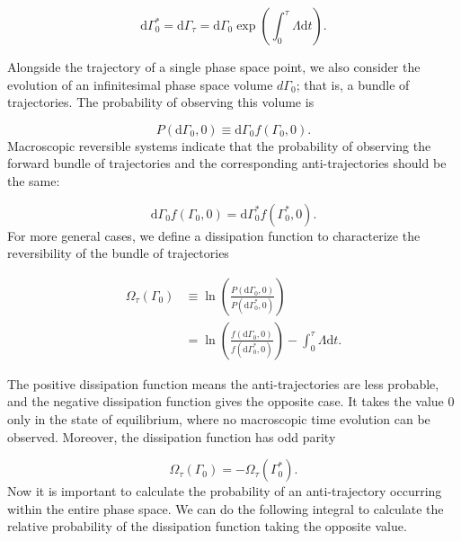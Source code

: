\documentclass[ reprint, amsmath,amssymb, aps,]{revtex4-1}
\begin{document}
\begin{equation}\label{eq:phase_compress}
\mathrm{d}\Gamma_0^*=\mathrm{d}\Gamma_\tau=\mathrm{d}\Gamma_0\exp\left(\int_0^\tau \Lambda\mathrm{d}t\right).
\end{equation}

Alongside the trajectory of a single phase space point, we also consider the evolution of an infinitesimal phase space volume $d\Gamma_0$; that is, a bundle of trajectories. The probability of observing this volume is

\begin{equation}
P(\mathrm{d}\Gamma_0,0)\equiv \mathrm{d}\Gamma_0 f(\Gamma_0,0) .
\end{equation}
Macroscopic reversible systems indicate that the probability of observing the forward bundle of trajectories and the corresponding anti-trajectories should be the same: 

\begin{equation}
 \mathrm{d}\Gamma_0 f(\Gamma_0,0) =\mathrm{d}\Gamma^*_0 f(\Gamma^*_0,0).
\end{equation}
For more general cases, we define a dissipation function to characterize the reversibility of the bundle of trajectories

\begin{equation}
\begin{split}
\Omega_\tau(\Gamma_0)
&\equiv \ln\left(\frac{P(\mathrm{d}\Gamma_0,0)}{P(\mathrm{d}\Gamma_0^*,0)}\right)\\
&=\ln\left(\frac{f(\mathrm{d}\Gamma_0,0)}{f(\mathrm{d}\Gamma_0^*,0)}\right)-\int_0^\tau \Lambda\mathrm{d}t.
\end{split}
\end{equation}

 The positive dissipation function means the anti-trajectories are less probable, and the negative dissipation function gives the opposite case. It takes the value $0$ only in the state of equilibrium, where no macroscopic time evolution can be observed. Moreover, the dissipation function has odd parity

\begin{equation}\label{eq:dissipation_odd}
\Omega_\tau(\Gamma_0)=-\Omega_\tau(\Gamma_0^*).
\end{equation}
Now it is important to calculate the probability of an anti-trajectory occurring within the entire phase space. We can do the following integral to calculate the relative probability of the dissipation function taking the opposite value.
\end{document}
